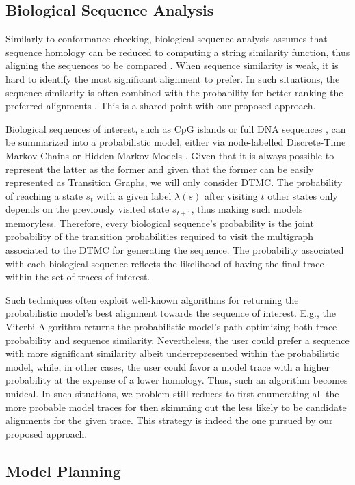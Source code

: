 \subsection{Biological Sequence Analysis}
Similarly to conformance checking, biological sequence analysis assumes that sequence homology can be reduced to computing a string similarity function, thus aligning the sequences to be compared \cite{durbin1998biological}. When sequence similarity is weak, it is hard to identify the most significant alignment to prefer. In such situations, the sequence similarity is often combined with the probability for better ranking the preferred alignments \cite{durbin1998biological}. This is a shared point with our proposed approach. 

Biological sequences of interest, such as CpG islands \cite{kxq005} or full DNA sequences \cite{BISHOP1986159}, can be summarized into a probabilistic model, either via node-labelled Discrete-Time Markov Chains \cite{RyabkoU08} or Hidden Markov Models \cite{Helske2018}. Given that it is always possible to represent the latter as the former \cite{DUPONT20051349} and given that the former can be easily represented as Transition Graphs, we will only consider DTMC. The probability of reaching a state $s_t$ with a given label $\lambda(s)$ after visiting $t$ other states only depends on the previously visited state $s_{t+1}$, thus making such models memoryless. Therefore, every biological sequence's probability is the joint probability of the transition probabilities required to visit the multigraph associated to the DTMC for generating the sequence. The probability associated with each biological sequence reflects the likelihood of having the final trace within the set of traces of interest. 

Such techniques often exploit well-known algorithms for returning the probabilistic model's best alignment towards the sequence of interest. E.g., the Viterbi Algorithm \cite{Viterbi67} returns the probabilistic model's path optimizing both trace probability and sequence similarity.  Nevertheless, the user could prefer a sequence with more significant similarity albeit underrepresented within the probabilistic model, while, in other cases, the user could favor a model trace with a higher probability at the expense of a lower homology. Thus, such an algorithm becomes unideal. In such situations, we problem still reduces to first enumerating all the more probable model traces for then skimming out the less likely to be candidate alignments for the given trace. This strategy is indeed the one pursued by our proposed approach. 


\subsection{Model Planning}